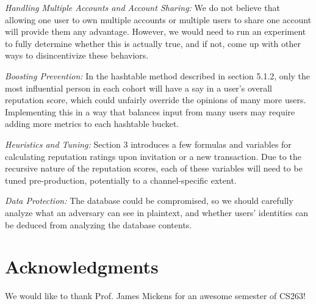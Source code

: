 \documentclass[letterpaper,twocolumn,10pt]{article}
\begin{document}
\textit{Handling Multiple Accounts and Account Sharing:} We do not believe that allowing one user to own multiple accounts or multiple users to share one account will provide them any advantage. However, we would need to run an experiment to fully determine whether this is actually true, and if not, come up with other ways to disincentivize these behaviors.

\textit{Boosting Prevention:} In the hashtable method described in section 5.1.2, only the most influential person in each cohort will have a say in a user's overall reputation score, which could unfairly override the opinions of many more users. Implementing this in a way that balances input from many users may require adding more metrics to each hashtable bucket.

\textit{Heuristics and Tuning:} Section 3 introduces a few formulas and variables for calculating reputation ratings upon invitation or a new transaction. Due to the recursive nature of the reputation scores, each of these variables will need to be tuned pre-production, potentially to a channel-specific extent.

\textit{Data Protection:} The database could be compromised, so we should carefully analyze what an adversary can see in plaintext, and whether users' identities can be deduced from analyzing the database contents.

\section*{Acknowledgments}
We would like to thank Prof. James Mickens for an awesome semester of CS263!


\end{document}
